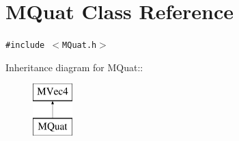\hypertarget{class_m_quat}{
\section{MQuat Class Reference}
\label{class_m_quat}
}
{\tt \#include $<$MQuat.h$>$}

Inheritance diagram for MQuat::\begin{figure}[H]
\begin{center}
\leavevmode
\includegraphics[height=2cm]{class_m_quat}
\end{center}
\end{figure}
